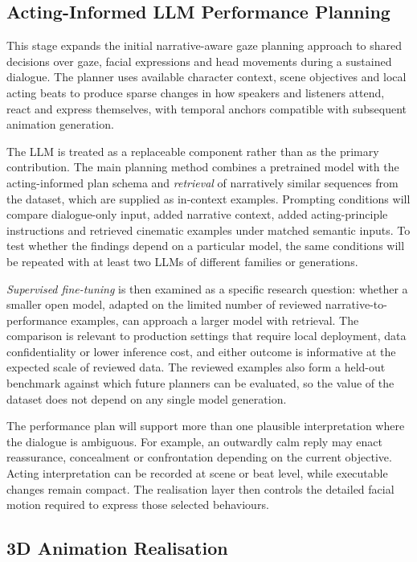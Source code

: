 \documentclass[11pt,a4paper]{article}
\begin{document}
\subsection{Acting-Informed LLM Performance Planning}
\label{sec:planning}

This stage expands the initial narrative-aware gaze planning approach to shared decisions over gaze, facial expressions and head movements during a sustained dialogue. The planner uses available character context, scene objectives and local acting beats to produce sparse changes in how speakers and listeners attend, react and express themselves, with temporal anchors compatible with subsequent animation generation.

The LLM is treated as a replaceable component rather than as the primary contribution. The main planning method combines a pretrained model with the acting-informed plan schema and \emph{retrieval} of narratively similar sequences from the dataset, which are supplied as in-context examples. Prompting conditions will compare dialogue-only input, added narrative context, added acting-principle instructions and retrieved cinematic examples under matched semantic inputs. To test whether the findings depend on a particular model, the same conditions will be repeated with at least two LLMs of different families or generations.

\emph{Supervised fine-tuning} is then examined as a specific research question: whether a smaller open model, adapted on the limited number of reviewed narrative-to-performance examples, can approach a larger model with retrieval. The comparison is relevant to production settings that require local deployment, data confidentiality or lower inference cost, and either outcome is informative at the expected scale of reviewed data. The reviewed examples also form a held-out benchmark against which future planners can be evaluated, so the value of the dataset does not depend on any single model generation.

The performance plan will support more than one plausible interpretation where the dialogue is ambiguous. For example, an outwardly calm reply may enact reassurance, concealment or confrontation depending on the current objective. Acting interpretation can be recorded at scene or beat level, while executable changes remain compact. The realisation layer then controls the detailed facial motion required to express those selected behaviours.

\subsection{3D Animation Realisation}
\end{document}
